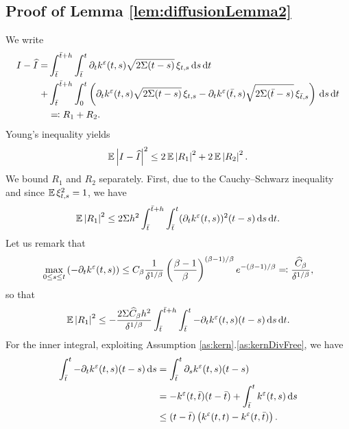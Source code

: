 \documentclass[10pt]{article}
\begin{document}
\begin{appendices}
\subsection*{Proof of Lemma \ref{lem:diffusionLemma2}}
We write
\begin{equation}
\begin{aligned}
I - \widehat I = &\int_{\bar t}^{\bar t+h} \int_{\bar{t}}^t \partial_t k^\varepsilon(t, s) \sqrt{2\Sigma(t-s)} \, \xi_{t,s} \,\mathrm{d} s \,\mathrm{d} t\\
+ &\int_{\bar t}^{\bar t+h} \int_0^t \left( \partial_t k^\varepsilon(t, s) \sqrt{2\Sigma(t-s)} \, \xi_{t,s}  - \partial_t k^\varepsilon(\bar t, s) \sqrt{2\Sigma(\bar t-s)} \, \xi_{\bar t,s} \right)\,\mathrm{d} s \,\mathrm{d} t\\
&\eqqcolon R_1 + R_2.
\end{aligned}
\end{equation}
Young's inequality yields
\begin{equation}
\operatorname{\mathbb{E}}\left\lvert I-\widehat I\right\rvert^2 \leq 2\operatorname{\mathbb{E}}\left\lvert R_1\right\rvert^2 + 2\operatorname{\mathbb{E}}\left\lvert R_2\right\rvert^2.
\end{equation}
We bound $R_1$ and $R_2$ separately. First, due to the Cauchy--Schwarz inequality and since $\operatorname{\mathbb{E}} \xi_{t,s}^2 = 1$, we have
\begin{equation}
\operatorname{\mathbb{E}} \left\lvert R_1\right\rvert^2 \leq 2\Sigma h^2 \int_{\bar t}^{\bar t+h} \int_{\bar{t}}^t (\partial_t k^\varepsilon(t, s))^2  (t-s) \,\mathrm{d} s \,\mathrm{d} t.
\end{equation}
Let us remark that
\begin{equation}
	\max_{0\leq s \leq t} \left( -\partial_t k^\varepsilon(t,s) \right) \leq	C_\beta \frac1{\delta^{1/\beta}} \left(\frac{\beta - 1}{\beta}\right)^{(\beta - 1)/\beta} e^{-(\beta-1)/\beta} \eqqcolon \frac{\widehat C_\beta}{\delta^{1/\beta}},
\end{equation}
so that
\begin{equation}
\operatorname{\mathbb{E}} \left\lvert R_1\right\rvert^2 \leq - \frac{2\Sigma  \widehat C_\beta h^2}{\delta^{1/\beta}} \int_{\bar{t}}^{\bar t + h}\int_{\bar t}^t -\partial_t k^\varepsilon(t, s)(t-s) \,\mathrm{d} s \,\mathrm{d} t.
\end{equation}
For the inner integral, exploiting Assumption \ref{as:kern}.\ref{as:kernDivFree}, we have
\begin{equation}
\begin{aligned}
\int_{\bar t}^t -\partial_t k^\epl(t, s)(t-s) \dd s &= \int_{\bar t}^t \partial_s k^\epl(t, s)(t-s)\\
&= -k^\epl(t, \bar t)(t - \bar t) + \int_{\bar t}^t k^\epl(t, s) \dd s \\
&\leq (t - \bar t) \left(k^\epl(t, t) - k^\epl(t, \bar t)\right).
\end{aligned}

\end{equation}
\end{appendices}
\end{document}
